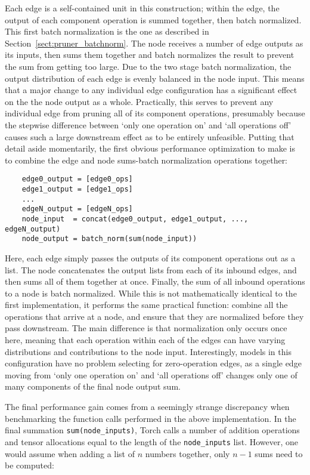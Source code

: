 Each edge is a self-contained unit in this construction; within the edge, the output of each component
operation is summed together, then batch normalized. This first batch normalization is the one as described in
Section~\ref{sect:pruner_batchnorm}. The node receives a number of edge outputs as its inputs,
then sums them together and batch normalizes the result to prevent the sum from getting too large. Due to the two
stage batch normalization, the output distribution of each edge is evenly balanced in the node input. This means that a
major change to any individual edge configuration has a significant effect on the the node output as a whole. Practically,
this serves to prevent any individual edge from pruning all of its component operations, presumably because the stepwise
difference between `only one operation on' and `all operations off' causes such a large downstream effect as to be
entirely unfeasible. Putting that detail aside momentarily, the first obvious performance optimization to make is to
combine the edge and node sums-batch normalization operations together:

\begin{Verbatim}
	edge0_output = [edge0_ops]
	edge1_output = [edge1_ops]
	...
	edgeN_output = [edgeN_ops]
	node_input  = concat(edge0_output, edge1_output, ..., edgeN_output)
	node_output = batch_norm(sum(node_input))
\end{Verbatim}

Here, each edge simply passes the outputs of its component operations out as a list. The node concatenates the output lists
from each of its inbound edges, and then sums all of them together at once. Finally, the sum of all inbound operations
to a node is batch normalized. While this is not mathematically identical to the first implementation, it performs the
same practical function: combine all the operations that arrive at a node, and ensure that they are normalized before they
pass downstream. The main difference is that normalization only occurs once here, meaning that each operation within each
of the edges can have varying distributions and contributions to the node input. Interestingly, models in this configuration
have no problem selecting for zero-operation edges, as a single edge moving from `only one operation on' and `all operations off'
changes only one of many components of the final node output sum.

The final performance gain comes from a seemingly strange discrepancy when benchmarking the function calls performed in the
above implementation. In the final summation \texttt{sum(node\_inputs)}, Torch calls a number of addition
operations and tensor allocations equal to the length of the \texttt{node\_inputs} list. However, one would assume when adding a list of $n$ numbers together,
only $n-1$ sums need to be computed:


